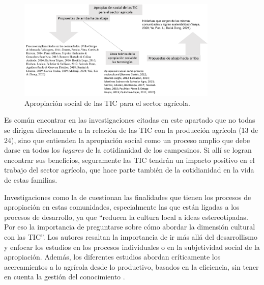 \documentclass[spanish]{textolivre}
\begin{document}
\begin{figure}[htbp]
\centering
\includegraphics[width=0.85\textwidth]{fig4.png}
\caption{Apropiación social de las TIC para el sector agrícola.}
\label{fig4}
\end{figure}

Es común encontrar en las investigaciones citadas en este apartado que no todas se dirigen directamente a la relación de las TIC con la producción agrícola (13 de 24), sino que entienden la apropiación social como un proceso amplio que debe darse en todos los \textit{lugares} de la cotidianidad de los campesinos. Si allí se logran encontrar sus beneficios, seguramente las TIC tendrán un impacto positivo en el trabajo del sector agrícola, que hace parte también de la cotidianidad en la vida de estas familias.  

Investigaciones como la de \textcite[p. 295]{paulhiac_perez_uso_2019} cuestionan las finalidades que tienen los procesos de apropiación en estas comunidades, especialmente las que están ligadas a los procesos de desarrollo, ya que “reducen la cultura local a ideas estereotipadas. Por eso la importancia de preguntarse sobre cómo abordar la dimensión cultural con las TIC”. Los autores resaltan la importancia de ir más allá del desarrollismo y enfocar los estudios en los procesos individuales o en la subjetividad social de la apropiación. Además, los diferentes estudios abordan críticamente los acercamientos a lo agrícola desde lo productivo, basados en la eficiencia, sin tener en cuenta la gestión del conocimiento \cite{santini_uso_2017}.
\end{document}
